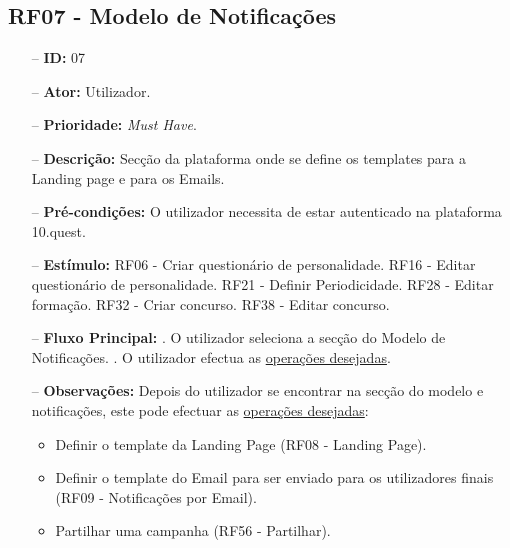 \subsection{RF07 - Modelo de Notificações}
\begin{itemize}
	\item[--] \textbf{ID:} 07
	\item[--]  \textbf{Ator:} Utilizador.
	\item[--]  \textbf{Prioridade:} \textit{Must Have}.
	\item[--]  \textbf{Descrição:} Secção da plataforma onde se define os templates para a Landing page e para os Emails.
	\item[--]  \textbf{Pré-condições:} O utilizador necessita de estar autenticado na plataforma 10.quest.
	\item[--]  \textbf{Estímulo:}  
		\subitem RF06 - Criar questionário de personalidade.
		\subitem RF16 - Editar questionário de personalidade.
		\subitem RF21 - Definir Periodicidade.
		\subitem RF28 - Editar formação.
		\subitem RF32 - Criar concurso.
		\subitem RF38 - Editar concurso.
	\item[--]  \textbf{Fluxo Principal:} 
		. O utilizador seleciona a secção do Modelo de Notificações.
		. O utilizador efectua as \underline{operações desejadas}.
	\item[--]  \textbf{Observações:} Depois do utilizador se encontrar na secção do modelo e notificações, este pode efectuar as \underline{operações desejadas}:
	\begin{itemize}
		\item Definir o template da Landing Page (RF08 - Landing Page).
		\item Definir o template do Email para ser enviado para os utilizadores finais (RF09 - Notificações por Email).
		\item Partilhar uma campanha (RF56 - Partilhar).
	\end{itemize}
\end{itemize}
\newpage

